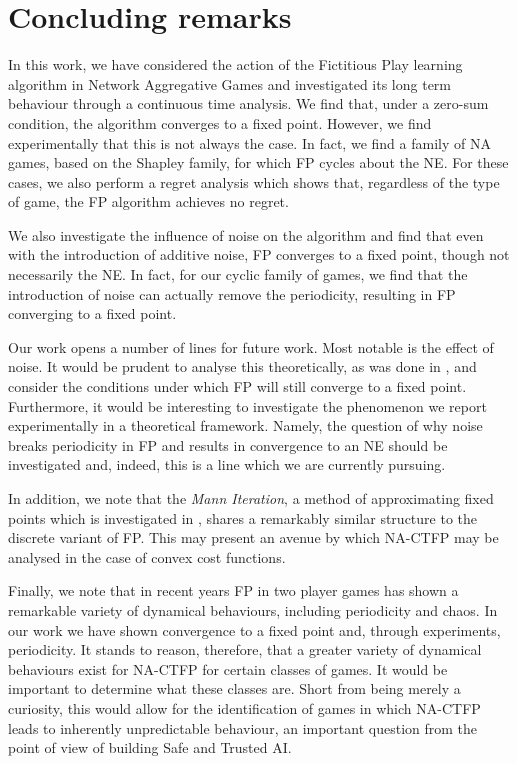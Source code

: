 \documentclass{article}
\theoremstyle{definition}
\begin{document}
\section{Concluding remarks}
	In this work, we have considered the action of the Fictitious Play learning algorithm in Network Aggregative Games and investigated its long term behaviour through a continuous time analysis. We find that, under a zero-sum condition, the algorithm converges to a fixed point. However, we find experimentally that this is not always the case. In fact, we find a family of NA games, based on the Shapley family, for which FP cycles about the NE. For these cases, we also perform a regret analysis which shows that, regardless of the type of game, the FP algorithm achieves no regret. 
	
	We also investigate the influence of noise on the algorithm and find that even with the introduction of additive noise, FP converges to a fixed point, though not necessarily the NE. In fact, for our cyclic family of games, we find that the introduction of noise can actually remove the periodicity, resulting in FP converging to a fixed point.
	
	Our work opens a number of lines for future work. Most notable is the effect of noise. It would be prudent to analyse this theoretically, as was done in \cite{MFGFP}, and consider the conditions under which FP will still converge to a fixed point. Furthermore, it would be interesting to investigate the phenomenon we report experimentally in a theoretical framework. Namely, the question of why noise breaks periodicity in FP and results in convergence to an NE should be investigated and, indeed, this is a line which we are currently pursuing.
	
	In addition, we note that the \emph{Mann Iteration}, a method of approximating fixed points which is investigated in \cite{Parise2020}, shares a remarkably similar structure to the discrete variant of FP. This may present an avenue by which NA-CTFP may be analysed in the case of convex cost functions. 
	
	Finally, we note that in recent years FP in two player games has shown a remarkable variety of dynamical behaviours, including periodicity and chaos. In our work we have shown convergence to a fixed point and, through experiments, periodicity. It stands to reason, therefore, that a greater variety of dynamical behaviours exist for NA-CTFP for certain classes of games. It would be important to determine what these classes are. Short from being merely a curiosity, this would allow for the identification of games in which NA-CTFP leads to inherently unpredictable behaviour, an important question from the point of view of building Safe and Trusted AI.
\end{document}
